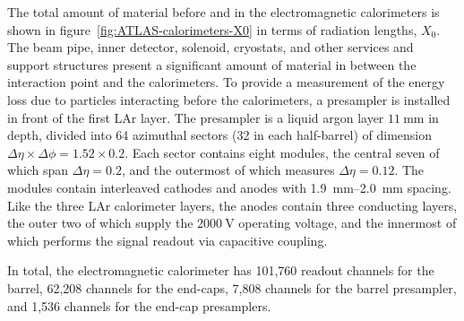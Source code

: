 The total amount of material before and in the electromagnetic calorimeters is shown in figure~\ref{fig:ATLAS-calorimeters-X0} in terms of radiation lengths, $X_0$. The beam pipe, inner detector, solenoid, cryostats, and other services and support structures present a significant amount of material in between the interaction point and the calorimeters. To provide a measurement of the energy loss due to particles interacting before the calorimeters, a presampler is installed in front of the first LAr layer. The presampler is a liquid argon layer $\SI{11}{\milli\meter}$ in depth, divided into 64 azimuthal sectors (32 in each half-barrel) of dimension $\Delta\eta\times\Delta\phi=1.52\times0.2$. Each sector contains eight modules, the central seven of which span $\Delta\eta=0.2$, and the outermost of which measures $\Delta\eta=0.12$.  The modules contain interleaved cathodes and anodes with \SIrange[range-phrase=-]{1.9}{2.0}{\milli\meter} spacing. Like the three LAr calorimeter layers, the anodes contain three conducting layers, the outer two of which supply the $\SI{2000}{\volt}$ operating voltage, and the innermost of which performs the signal readout via capacitive coupling.

In total, the electromagnetic calorimeter has 101,760 readout channels for the barrel, 62,208 channels for the end-caps, 7,808 channels for the barrel presampler, and 1,536 channels for the end-cap presamplers. 


